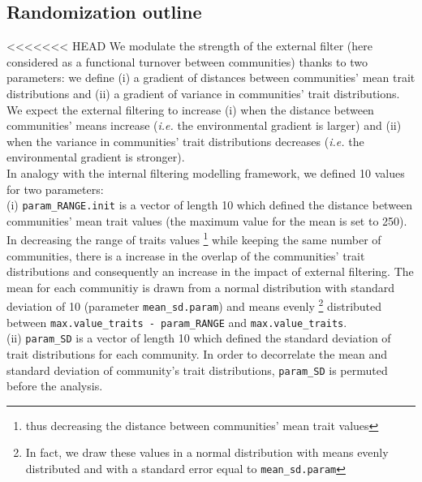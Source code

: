\documentclass[12pt]{article}\usepackage[]{graphicx}\usepackage[]{color}
\begin{document}
\begin{landscape}
\begin{table}[ht]
{ \subsection {Randomization outline}
 
<<<<<<< HEAD
We modulate the strength of the external filter (here considered as a functional turnover between communities) thanks to two parameters:
we define (i) a gradient of distances between communities' mean trait distributions and (ii) a gradient of variance in communities' trait distributions. We expect the external filtering to increase (i) when the distance between communities' means increase (\textit{i.e.} the environmental gradient is larger) and (ii) when the variance in communities' trait distributions decreases (\textit{i.e.} the environmental gradient is stronger).
\\

In analogy with the internal filtering modelling framework, we defined 10 values for two parameters:
\\

 (i) \texttt{param\_{}RANGE.init} is a vector of length 10 which defined the distance between communities' mean trait values (the maximum value for the mean is set to 250). In decreasing the range of traits values \footnote{thus decreasing the distance between communities' mean trait values} while keeping the same number of communities, there is a increase in the overlap of the communities' trait distributions and consequently an increase in the impact of external filtering. The mean for each communitiy is drawn from a normal distribution with standard deviation of 10 (parameter \texttt{mean\_{}sd.param}) and means evenly
\footnote{In fact, we draw these values in a normal distribution with means evenly distributed and with a standard error equal to \texttt{mean\_{}sd.param}} distributed between \texttt{max.value\_{}traits - param\_{}RANGE} and \texttt{max.value\_{}traits}.
\\

(ii) \texttt{param\_{}SD} is a vector of length 10 which defined the standard deviation of trait distributions for each community. In order to decorrelate the mean and standard deviation of community's trait distributions, \texttt{param\_{}SD} is permuted before the analysis. 
\\

}
\end{table}
\end{landscape}
\end{document}
